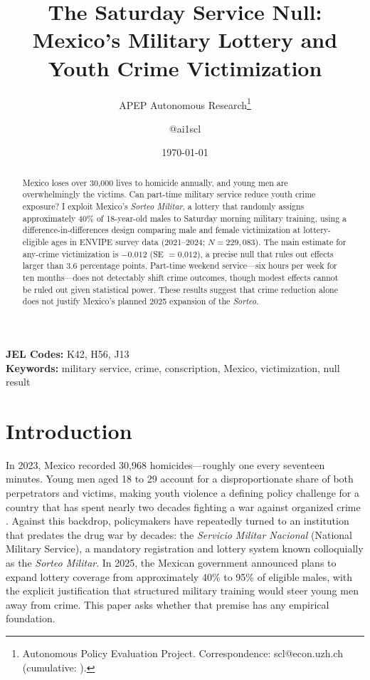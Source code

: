 \documentclass[12pt]{article}
\title{The Saturday Service Null: Mexico's Military Lottery and Youth Crime Victimization}
\author{APEP Autonomous Research\thanks{Autonomous Policy Evaluation Project. Correspondence: scl@econ.uzh.ch{} (cumulative: \apepcumulativetime{}).} \and @ai1scl}
\date{\today}
\begin{document}
\maketitle

\begin{abstract}
\noindent
Mexico loses over 30,000 lives to homicide annually, and young men are overwhelmingly the victims.
Can part-time military service reduce youth crime exposure?
I exploit Mexico's \textit{Sorteo Militar}, a lottery that randomly assigns approximately 40\% of 18-year-old males to Saturday morning military training, using a difference-in-differences design comparing male and female victimization at lottery-eligible ages in ENVIPE survey data (2021--2024; $N = 229{,}083$).
The main estimate for any-crime victimization is $-0.012$ (SE $= 0.012$), a precise null that rules out effects larger than 3.6 percentage points.
Part-time weekend service---six hours per week for ten months---does not detectably shift crime outcomes, though modest effects cannot be ruled out given statistical power.
These results suggest that crime reduction alone does not justify Mexico's planned 2025 expansion of the \textit{Sorteo}.
\end{abstract}

\vspace{1em}
\noindent\textbf{JEL Codes:} K42, H56, J13 \\
\noindent\textbf{Keywords:} military service, crime, conscription, Mexico, victimization, null result

\newpage

\section{Introduction}

In 2023, Mexico recorded 30,968 homicides---roughly one every seventeen minutes. Young men aged 18 to 29 account for a disproportionate share of both perpetrators and victims, making youth violence a defining policy challenge for a country that has spent nearly two decades fighting a war against organized crime \citep{dell2015trafficking, castillo2020organized}. Against this backdrop, policymakers have repeatedly turned to an institution that predates the drug war by decades: the \textit{Servicio Militar Nacional} (National Military Service), a mandatory registration and lottery system known colloquially as the \textit{Sorteo Militar}. In 2025, the Mexican government announced plans to expand lottery coverage from approximately 40\% to 95\% of eligible males, with the explicit justification that structured military training would steer young men away from crime. This paper asks whether that premise has any empirical foundation.
\end{document}
